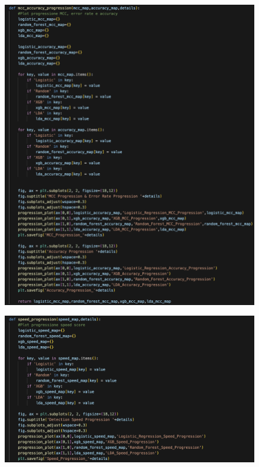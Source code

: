 \begin{appendices}
\begin{figure}[H]
    \centering
    \includegraphics[width=1\linewidth]{21.png}
    \label{fig:enter-label}
\end{figure}

\begin{figure}[H]
    \centering
    \includegraphics[width=1\linewidth]{22.png}
    \label{fig:enter-label}
\end{figure}


\end{appendices}
